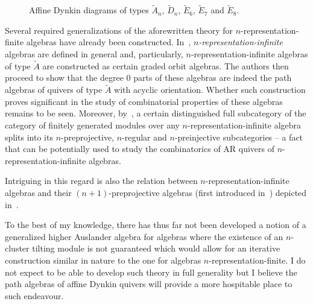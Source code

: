 \documentclass[a4paper,oneside,svgnames]{amsart}
\theoremstyle{plain}
\theoremstyle{definition}
\begin{document}
\begin{figure}[ht]
\begin{subfigure}[b]{.53\textwidth}
  \end{subfigure}\linebreak
  \caption{Affine Dynkin diagrams of types $\tilde{A}_n$, $\tilde{D}_n$,
  $\tilde{E}_6$, $\tilde{E}_7$ and $\tilde{E}_8$.}
  \label{fig:affine-dynkin-diagrams}
 \end{figure}

 Several required generalizations of the aforewritten theory for
 $n$-representation-finite algebras have already been constructed.
 In~\cite{hio}, \emph{$n$-representation-infinite} algebras are defined in
 general and, particularly, $n$-representation-infinite algebras of type
 $\tilde{A}$ are constructed as certain graded orbit algebras. The authors then
 proceed to show that the degree 0 parts of these algebras are indeed the path
 algebras of quivers of type $\tilde{A}$ with acyclic orientation. Whether such
 construction proves significant in the study of combinatorial properties of
 these algebras remains to be seen. Moreover, by~\cite[Theorem 4.18]{hio}, a
 certain distinguished full subcategory of the category of finitely generated
 modules over any $n$-representation-infinite algebra splits into its
 $n$-preprojective, $n$-regular and $n$-preinjective subcategories -- a fact
 that can be potentially used to study the combinatorics of AR quivers of
 $n$-representation-infinite algebras.

 Intriguing in this regard is also the relation between
 $n$-representation-infinite algebras and their $(n+1)$-preprojective algebras
 (first introduced in~\cite{gp}) depicted in~\cite[Theorem B]{gi}.

 To the best of my knowledge, there has thus far not been developed a notion of
 a generalized higher Auslander algebra for algebras where the existence of an
 $n$-cluster tilting module is not guaranteed which would allow for an iterative
 construction similar in nature to the one for algebras
 $n$-representation-finite. I do not expect to be able to develop such theory in
 full generality but I believe the path algebras of affine Dynkin quivers will
 provide a more hospitable place to such endeavour.
\end{document}
